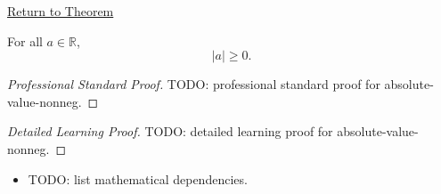 \newpage
{}
\label{prf:absolute-value-nonneg}

\begin{remark*}[Return]
\hyperref[thm:absolute-value-nonneg]{Return to Theorem}
\end{remark*}

\begin{theorem*}
For all $a \in \mathbb{R}$,
\[
  \lvert a \rvert \ge 0.
\]
\end{theorem*}

\begin{proof}[Professional Standard Proof]
\LRAProofBodyStart
TODO: professional standard proof for absolute-value-nonneg.
\end{proof}

\begin{proof}[Detailed Learning Proof]
\LRAProofBodyStart
TODO: detailed learning proof for absolute-value-nonneg.
\end{proof}

\begin{remark*}
\end{remark*}

\begin{dependencies}
\begin{itemize}
  \item TODO: list mathematical dependencies.
\end{itemize}
\end{dependencies}

\clearpage
